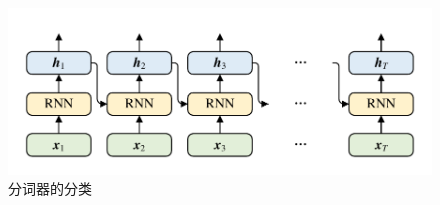 \begin{figure}[htb]
	\centering
	\includegraphics[page=6, width=0.6\linewidth]{images/structure.pdf}
	\caption{分词器的分类}
	\label{fig:token}
\end{figure}